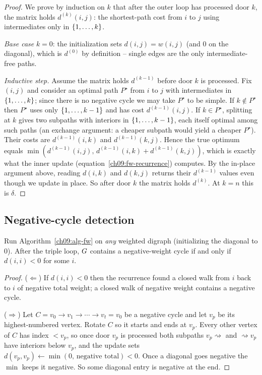 \begin{proof}
We prove by induction on $k$ that after the outer loop has processed door $k$, the matrix holds
$d^{(k)}(i,j)$: the shortest-path cost from $i$ to $j$ using intermediates only in $\{1,\dots,k\}$.

\emph{Base case} $k=0$: the initialization sets $d(i,j)=w(i,j)$ (and $0$ on the diagonal), which is
$d^{(0)}$ by definition -- single edges are the only intermediate-free paths.

\emph{Inductive step.} Assume the matrix holds $d^{(k-1)}$ before door $k$ is processed. Fix $(i,j)$
and consider an optimal path $P^\star$ from $i$ to $j$ with intermediates in $\{1,\dots,k\}$; since
there is no negative cycle we may take $P^\star$ to be simple. If $k\notin P^\star$ then $P^\star$
uses only $\{1,\dots,k-1\}$ and has cost $d^{(k-1)}(i,j)$. If $k\in P^\star$, splitting at $k$ gives
two subpaths with interiors in $\{1,\dots,k-1\}$, each itself optimal among such paths (an exchange
argument: a cheaper subpath would yield a cheaper $P^\star$). Their costs are $d^{(k-1)}(i,k)$ and
$d^{(k-1)}(k,j)$. Hence the true optimum equals
$\min(d^{(k-1)}(i,j),\,d^{(k-1)}(i,k)+d^{(k-1)}(k,j))$, which is exactly what the inner update
(equation~\ref{ch09:fw-recurrence}) computes. By the in-place argument above, reading $d(i,k)$ and
$d(k,j)$ returns their $d^{(k-1)}$ values even though we update in place. So after door $k$ the matrix
holds $d^{(k)}$. At $k=n$ this is $\delta$.
\end{proof}

\subsection{Negative-cycle detection}
\label{ch09:fw-negcycle}

\begin{theorem}
\label{ch09:thm-fw-negcycle}
Run Algorithm~\ref{ch09:alg-fw} on \emph{any} weighted digraph (initializing the diagonal to $0$).
After the triple loop, $G$ contains a negative-weight cycle if and only if $d(i,i)<0$ for some $i$.
\end{theorem}

\begin{proof}
($\Leftarrow$) If $d(i,i)<0$ then the recurrence found a closed walk from $i$ back to $i$ of negative
total weight; a closed walk of negative weight contains a negative cycle.

($\Rightarrow$) Let $C=v_0\to v_1\to\cdots\to v_t=v_0$ be a negative cycle and let $v_p$ be its
highest-numbered vertex. Rotate $C$ so it starts and ends at $v_p$. Every other vertex of $C$ has index
$<v_p$, so once door $v_p$ is processed both subpaths $v_p\rightsquigarrow$ and $\rightsquigarrow v_p$
have interiors below $v_p$, and the update sets $d(v_p,v_p)\leftarrow\min(0,\,\text{negative total})<0$.
Once a diagonal goes negative the $\min$ keeps it negative. So some diagonal entry is negative at the
end.
\end{proof}

